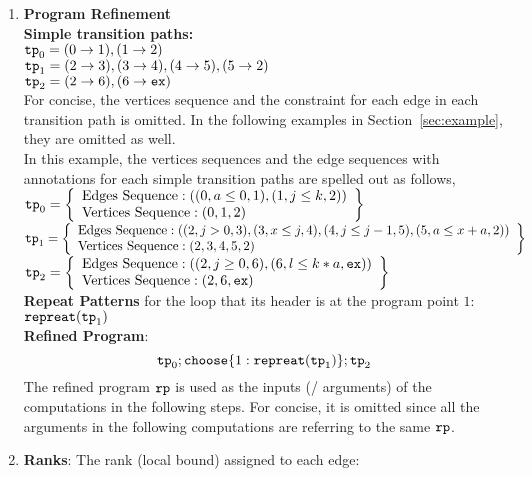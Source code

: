 \begin{enumerate}
    \item \textbf{Program Refinement}
    \\
    \textbf{Simple transition paths:}
      \\
  $\mathtt{tp}_0 =  (0 \to 1), (1 \to 2)$
  \\
  $\mathtt{tp}_1 =  (2 \to 3), (3 \to 4), (4 \to 5), (5 \to 2)$
  \\
  $\mathtt{tp}_2 = (2 \to 6), (6 \to \mathtt{ex})$
  \\
  For concise, the vertices sequence and the constraint for each edge in each transition path is omitted. 
  In the following examples in Section~\ref{sec:example}, they 
  are omitted as well. 
  \\
  In this example, the vertices sequences and the edge sequences with annotations
  for each simple transition paths are spelled out as follows,
  \\
  $\tpath_0 =  
    \left\{ \begin{array}{l}
    \text{Edges Sequence}: ((0, a \leq 0, 1), (1, j \leq k, 2))
    \\
    \text{Vertices Sequence}: (0, 1, 2)
    \end{array}\right\}
  $
  \\
  $\tpath_1 =  
  \left\{ \begin{array}{l}
    \text{Edges Sequence}: ((2, j > 0, 3), (3, x \leq j, 4), (4, j \leq j - 1, 5), (5, a \leq x + a, 2))
    \\
    \text{Vertices Sequence}: (2, 3, 4, 5, 2)
    \end{array}\right\}
  $
  \\
  $\tpath_2 = 
  \left\{ \begin{array}{l}
    \text{Edges Sequence}: ((2, j \geq 0, 6), (6, l \leq k*a, \lex))
    \\
    \text{Vertices Sequence}: (2, 6, \lex)
    \end{array}\right\}
    $
  \\
  \textbf{Repeat Patterns} for the loop that its header is
  at the program point $1$: $\mathtt{repreat}(\mathtt{tp}_1)$
  \\
  \textbf{Refined Program}:
  \[
    \tpath_0 ; \rpchoose{1: \rprepeat(\tpath_1)}; \tpath_2
  \]
  The refined program $\mathtt{rp}$ is used as the inputs (/ arguments) of the computations in the following steps.
  For concise, it is omitted since all the arguments in the following computations are referring to the same $\mathtt{rp}$.
  \item \textbf{Ranks}:
    The rank (local bound) assigned to each edge:

\end{enumerate}
